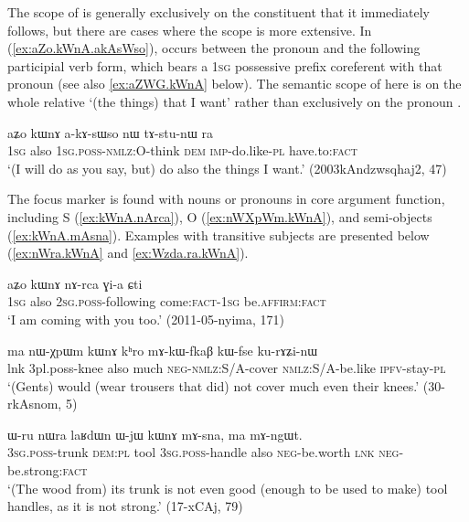 The scope of   is generally exclusively on the constituent that it immediately follows, but there are cases where the scope is more extensive. In (\ref{ex:aZo.kWnA.akAsWso}),  occurs between the pronoun  and the following participial verb form, which bears a \textsc{1sg} possessive prefix  coreferent with that pronoun (see also \ref{ex:aZWG.kWnA} below). The semantic scope of  here is on the whole relative  `(the things) that I want' rather than exclusively on the pronoun .

\begin{exe}
\ex \label{ex:aZo.kWnA.akAsWso}
 \gll aʑo kɯnɤ a-kɤ-sɯso nɯ tɤ-stu-nɯ ra \\
 \textsc{1sg} also \textsc{1sg}.\textsc{poss}-\textsc{nmlz}:O-think \textsc{dem} \textsc{imp}-do.like-\textsc{pl} have.to:\textsc{fact} \\
 \glt `(I will do as you say, but) do also the things I want.' (2003kAndzwsqhaj2, 47)
\end{exe}

The focus marker  is found with nouns or pronouns in core argument function, including S (\ref{ex:kWnA.nArca}), O (\ref{ex:nWXpWm.kWnA}), and semi-objects (\ref{ex:kWnA.mAsna}).  Examples with transitive subjects are presented below (\ref{ex:nWra.kWnA} and \ref{ex:Wzda.ra.kWnA}).

 \begin{exe}
\ex \label{ex:kWnA.nArca}
\gll aʑo kɯnɤ nɤ-rca ɣi-a ɕti  \\
\textsc{1sg} also \textsc{2sg}.\textsc{poss}-following come:\textsc{fact}-\textsc{1sg} be.\textsc{affirm}:\textsc{fact} \\
\glt `I am coming with you too.' (2011-05-nyima, 171)
 \end{exe}
 
   \begin{exe}
\ex \label{ex:nWXpWm.kWnA}
\gll    ma nɯ-χpɯm kɯnɤ kʰro mɤ-kɯ-fkaβ kɯ-fse ku-rɤʑi-nɯ  \\
lnk 3pl.poss-knee also much \textsc{neg}-\textsc{nmlz}:S/A-cover \textsc{nmlz}:S/A-be.like \textsc{ipfv}-stay-\textsc{pl} \\
\glt `(Gents) would (wear trousers that did) not cover much even their knees.'  (30-rkAsnom, 5) 
  \end{exe}
  
  \begin{exe}
 \ex \label{ex:kWnA.mAsna}
 \gll   ɯ-ru nɯra laʁdɯn ɯ-jɯ kɯnɤ mɤ-sna, ma mɤ-ngɯt. \\
 \textsc{3sg}.\textsc{poss}-trunk \textsc{dem}:\textsc{pl} tool \textsc{3sg}.\textsc{poss}-handle also \textsc{neg}-be.worth \textsc{lnk}  \textsc{neg}-be.strong:\textsc{fact} \\
 \glt `(The wood from) its trunk is not even good (enough to be used to make) tool handles, as it is not strong.'  (17-xCAj, 79)
  \end{exe}

